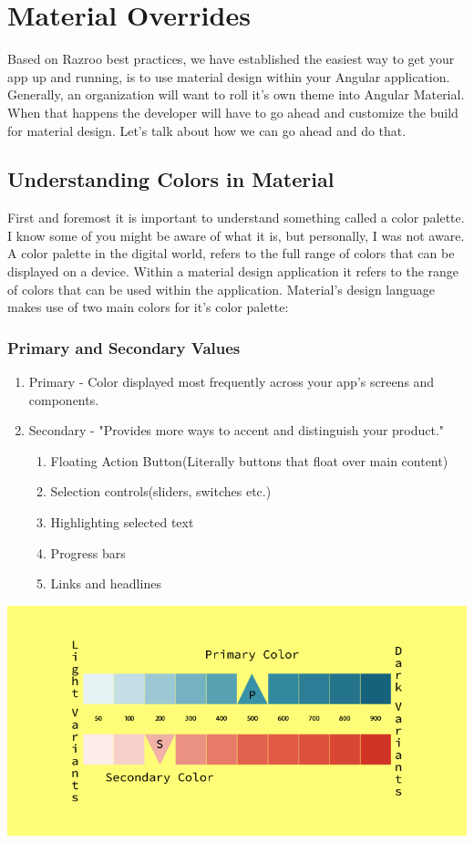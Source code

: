 
\chapter{ Material Overrides }

Based on Razroo best practices, we have established the easiest way to get 
your app up and running, is to use material design within your Angular 
application. Generally, an organization will want to roll it's own theme into 
Angular Material. When that happens the developer will have to go ahead and 
customize the build for material design. Let's talk about how we can go ahead 
and do that. 

\section{Understanding Colors in Material}
First and foremost it is important to understand something called a color 
palette. I know some of you might be aware of what it is, but personally, I was
not aware. A color palette in the digital world, refers to the full range of 
colors that can be displayed on a device. Within a material design application 
it refers to the range of colors that can be used within the application. 
Material's design language makes use of two main colors for it's color palette: 

\subsection{Primary and Secondary Values}
\begin{enumerate}
  \item Primary - Color displayed most frequently across your app's screens and
  components. 
  \item Secondary - "Provides more ways to accent and distinguish your product."
  \begin{enumerate}
    \item Floating Action Button(Literally buttons that float over main content)
    \item Selection controls(sliders, switches etc.)
    \item Highlighting selected text
    \item Progress bars
    \item Links and headlines
  \end{enumerate}
\end{enumerate}

\includegraphics[width=6in]{design-language-system/material-overrides/material-design-palette.png}

